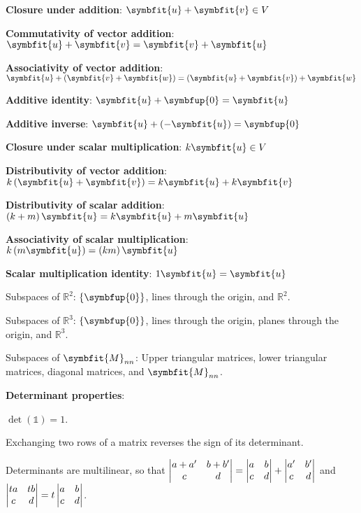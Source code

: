 \documentclass{article}
\begin{document}
\indent\textbf{Closure under addition}: 
$\symbfit{u}+\symbfit{v} \in V$ 

\indent\textbf{Commutativity of vector addition}: 
$\symbfit{u} + \symbfit{v} = \symbfit{v} + \symbfit{u}$

\indent\textbf{Associativity of vector addition}: 
$\symbfit{u} + \left(\symbfit{v} + \symbfit{w}\right) = 
\left(\symbfit{u} + \symbfit{v}\right) + \symbfit{w}$

\indent\textbf{Additive identity}: 
$\symbfit{u} + \symbfup{0} = \symbfit{u}$

\indent\textbf{Additive inverse}: 
$\symbfit{u} + \left(-\symbfit{u}\right) = \symbfup{0}$

\indent\textbf{Closure under scalar multiplication}: 
$k\symbfit{u} \in V$

\indent\textbf{Distributivity of vector addition}: 
$k \left(\symbfit{u} + \symbfit{v}\right) = k\symbfit{u} + k\symbfit{v}$

\indent\textbf{Distributivity of scalar addition}: 
$\left(k+m\right)\symbfit{u} = k\symbfit{u} + m\symbfit{u}$

\indent\textbf{Associativity of scalar multiplication}: 
$k\left(m\symbfit{u}\right)=\left(km\right)\symbfit{u}$

\indent\textbf{Scalar multiplication identity}: 
$1 \symbfit{u}=\symbfit{u}$

\noindent Subspaces of $\mathbb{R}^2$: $\left\{ \symbfup{0} \right\}$, 
lines through the origin, and $\mathbb{R}^2$.

\noindent Subspaces of $\mathbb{R}^3$: $\left\{ \symbfup{0} \right\}$, 
lines through the origin, planes through the origin, and $\mathbb{R}^3$.

\noindent Subspaces of $\symbfit{M}_{nn}$: Upper triangular matrices, 
lower triangular matrices, diagonal matrices, and $\symbfit{M}_{nn}$.

\noindent\textbf{Determinant properties}:

\indent$\det{\left( \mathbb{1} \right)}=1$. 

\indent Exchanging two rows of a matrix reverses the sign of its 
determinant. 

\indent Determinants are multilinear, so that 
$\mdet{a+a' & b+b' \\ c & d} 
= \mdet{a & b \\ c & d}+\mdet{a' & b' \\ c & d}$ and 
$\mdet{ta & tb \\ c & d}=t\mdet{a & b \\ c & d}$. 
\end{document}
